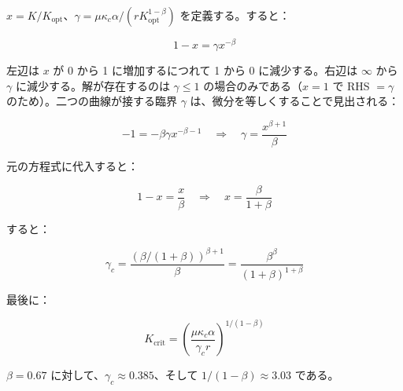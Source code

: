 \documentclass[12pt,a4paper]{article}
\newcommand{\kappac}{\kappa_c}
\theoremstyle{remark}
\begin{document}
	\(x = K/K_{\text{opt}}\)、\(\gamma = \mu \kappac \alpha / (r K_{\text{opt}}^{1-\beta})\) を定義する。すると：
	
	\begin{equation}
		1 - x = \gamma x^{-\beta}
		\label{eq:x-eqn}
	\end{equation}
	
	左辺は \(x\) が 0 から 1 に増加するにつれて 1 から 0 に減少する。右辺は \(\infty\) から \(\gamma\) に減少する。解が存在するのは \(\gamma \leq 1\) の場合のみである（\(x=1\) で RHS \(=\gamma\) のため）。二つの曲線が接する臨界 \(\gamma\) は、微分を等しくすることで見出される：
	
	\begin{equation}
		-1 = -\beta \gamma x^{-\beta-1} \quad \Rightarrow \quad \gamma = \frac{x^{\beta+1}}{\beta}
		\label{eq:derivative}
	\end{equation}
	
	元の方程式に代入すると：
	
	\begin{equation}
		1 - x = \frac{x}{\beta} \quad \Rightarrow \quad x = \frac{\beta}{1+\beta}
		\label{eq:x-crit}
	\end{equation}
	
	すると：
	
	\begin{equation}
		\gamma_c = \frac{(\beta/(1+\beta))^{\beta+1}}{\beta} = \frac{\beta^{\beta}}{(1+\beta)^{1+\beta}}
		\label{eq:gamma-c-app}
	\end{equation}
	
	最後に：
	
	\begin{equation}
		K_{\text{crit}} = \left( \frac{\mu \kappac \alpha}{\gamma_c r} \right)^{1/(1-\beta)}
		\label{eq:Kcrit-app}
	\end{equation}
	
	\(\beta = 0.67\) に対して、\(\gamma_c \approx 0.385\)、そして \(1/(1-\beta) \approx 3.03\) である。
	
\end{document}
